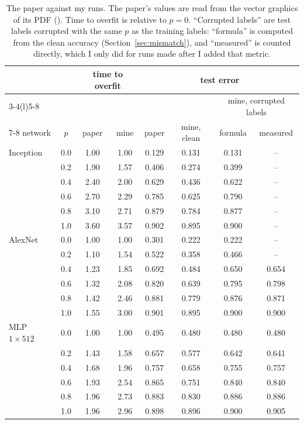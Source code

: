 \begin{table}[t]\centering\small
  \begin{tabular}{@{}l c cc cccc@{}}
    \toprule
    & & \multicolumn{2}{c}{time to overfit} & \multicolumn{4}{c}{test error}\\
    \cmidrule(lr){3-4}\cmidrule(l){5-8}
    & & & & & & \multicolumn{2}{c}{mine, corrupted labels}\\
    \cmidrule(l){7-8}
    network & $p$ & paper & mine & paper & mine, clean & formula & measured\\
    \midrule
    Inception & 0.0 & 1.00 & 1.00 & 0.129 & 0.131 & 0.131 & -- \\
    & 0.2 & 1.90 & 1.57 & 0.406 & 0.274 & 0.399 & -- \\
    & 0.4 & 2.40 & 2.00 & 0.629 & 0.436 & 0.622 & -- \\
    & 0.6 & 2.70 & 2.29 & 0.785 & 0.625 & 0.790 & -- \\
    & 0.8 & 3.10 & 2.71 & 0.879 & 0.784 & 0.877 & -- \\
    & 1.0 & 3.60 & 3.57 & 0.902 & 0.895 & 0.900 & -- \\
    \addlinespace
    AlexNet & 0.0 & 1.00 & 1.00 & 0.301 & 0.222 & 0.222 & -- \\
    & 0.2 & 1.10 & 1.54 & 0.522 & 0.358 & 0.466 & -- \\
    & 0.4 & 1.23 & 1.85 & 0.692 & 0.484 & 0.650 & 0.654 \\
    & 0.6 & 1.32 & 2.08 & 0.820 & 0.639 & 0.795 & 0.798 \\
    & 0.8 & 1.42 & 2.46 & 0.881 & 0.779 & 0.876 & 0.871 \\
    & 1.0 & 1.55 & 3.00 & 0.901 & 0.895 & 0.900 & 0.900 \\
    \addlinespace
    MLP $1\times512$ & 0.0 & 1.00 & 1.00 & 0.495 & 0.480 & 0.480 & 0.480 \\
    & 0.2 & 1.43 & 1.58 & 0.657 & 0.577 & 0.642 & 0.641 \\
    & 0.4 & 1.68 & 1.96 & 0.757 & 0.658 & 0.755 & 0.757 \\
    & 0.6 & 1.93 & 2.54 & 0.865 & 0.751 & 0.840 & 0.840 \\
    & 0.8 & 1.96 & 2.73 & 0.883 & 0.830 & 0.886 & 0.886 \\
    & 1.0 & 1.96 & 2.96 & 0.898 & 0.896 & 0.900 & 0.905 \\
    \bottomrule
  \end{tabular}
  \caption{The paper against my runs. The paper's values are read from the vector graphics of its PDF (). Time to overfit is relative to $p=0$. ``Corrupted labels'' are test labels corrupted with the same $p$ as the training labels: ``formula'' is computed from the clean accuracy (Section~\ref{sec:mismatch}), and ``measured'' is counted directly, which I only did for runs made after I added that metric.}
  \label{tab:numbers}
\end{table}

